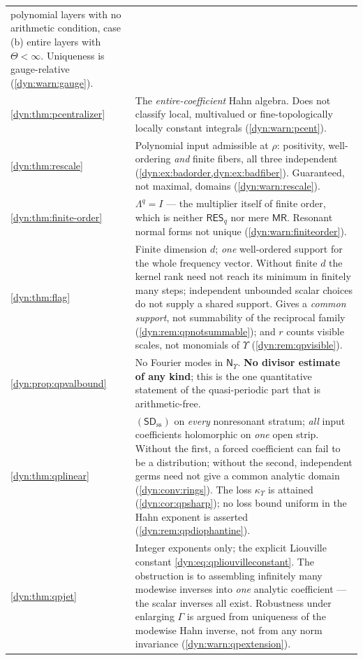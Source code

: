 \documentclass[11pt,letterpaper]{article}
\theoremstyle{definition}
\theoremstyle{remark}
\newcommand{\resq}{\mathsf{RES}_q}
\newcommand{\mres}{\mathsf{MR}}
\newcommand{\sdss}{\mathsf{SD}_{\mathrm{ss}}}
\newcommand{\qlat}{\mathsf N_{\Upsilon}}
\newcommand{\kups}{\kappa_{\Upsilon}}
\numberwithin{equation}{section}
\begin{document}
\begin{longtable}{@{}P{0.26\textwidth}P{0.67\textwidth}@{}}
polynomial layers with no arithmetic condition, case (b) entire layers with
$\Theta<\infty$. Uniqueness is gauge-relative
(\cref{dyn:warn:gauge}).\\[3pt]
\cref{dyn:thm:pcentralizer} &
The \emph{entire-coefficient} Hahn algebra. Does not classify local,
multivalued or fine-topologically locally constant integrals
(\cref{dyn:warn:pcent}).\\[3pt]
\cref{dyn:thm:rescale} &
Polynomial input admissible at $\rho$: positivity, well-ordering
\emph{and} finite fibers, all three independent
(\cref{dyn:ex:badorder,dyn:ex:badfiber}). Guaranteed, not maximal, domains
(\cref{dyn:warn:rescale}).\\[3pt]
\cref{dyn:thm:finite-order} &
$\Lambda^{q}=I$ --- the multiplier itself of finite order, which is neither
$\resq$ nor mere $\mres$. Resonant normal forms not unique
(\cref{dyn:warn:finiteorder}).\\[3pt]
\cref{dyn:thm:flag} &
Finite dimension $d$; \emph{one} well-ordered support for the whole
frequency vector. Without finite $d$ the kernel rank need not reach its
minimum in finitely many steps; independent unbounded scalar choices do not
supply a shared support. Gives a \emph{common support}, not summability of
the reciprocal family (\cref{dyn:rem:qpnotsummable}); and $r$ counts
visible scales, not monomials of $\Upsilon$
(\cref{dyn:rem:qpvisible}).\\[3pt]
\cref{dyn:prop:qpvalbound} &
No Fourier modes in $\qlat$. \textbf{No divisor estimate of any kind}; this
is the one quantitative statement of the quasi-periodic part that is
arithmetic-free.\\[3pt]
\cref{dyn:thm:qplinear} &
$(\sdss)$ on \emph{every} nonresonant stratum; \emph{all} input
coefficients holomorphic on \emph{one} open strip. Without the first, a
forced coefficient can fail to be a distribution; without the second,
independent germs need not give a common analytic domain
(\cref{dyn:conv:rings}). The loss $\kups$ is attained
(\cref{dyn:cor:qpsharp}); no loss bound uniform in the Hahn exponent is
asserted (\cref{dyn:rem:qpdiophantine}).\\[3pt]
\cref{dyn:thm:qpjet} &
Integer exponents only; the explicit Liouville constant
\eqref{dyn:eq:qpliouvilleconstant}. The obstruction is to assembling
infinitely many modewise inverses into \emph{one} analytic coefficient ---
the scalar inverses all exist. Robustness under enlarging $\Gamma$ is
argued from uniqueness of the modewise Hahn inverse, not from any norm
invariance (\cref{dyn:warn:qpextension}).\\[3pt]

\end{longtable}
\end{document}

